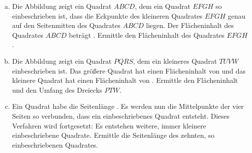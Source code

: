 \begin{exercise}
    \begin{enumerate}[a)]
      \item Die Abbildung zeigt ein Quadrat $ABCD$, dem ein Quadrat $EFGH$ so
            einbeschrieben ist, dass die Eckpunkte des kleineren Quadrates $EFGH$
            genau auf den Seitenmitten des Quadrates $ABCD$ liegen. Der Flächeninhalt
            des Quadrates $ABCD$ beträgt . Ermittle den Flächeninhalt des
            Quadrates $EFGH$.
      \item Die Abbildung zeigt ein Quadrat $PQRS$, dem ein kleineres Quadrat $TUVW$
            einbeschrieben ist. Das größere Quadrat hat einen Flächeninhalt von
             und das kleinere Quadrat hat einen Flächeninhalt von .
            Ermittle den Flächeninhalt und den Umfang des Dreiecks $PTW$.
      \item Ein Quadrat habe die Seitenlänge . Es werden nun die Mittelpunkte
            der vier Seiten so verbunden, dass ein einbeschriebenes Quadrat entsteht.
            Dieses Verfahren wird fortgesetzt: Es entstehen weitere, immer kleinere
            einbeschriebene Quadrate. Ermittle die Seitenlänge des zehnten, so
            einbeschriebenen Quadrates.
    \end{enumerate}
  \fi
\end{exercise}
